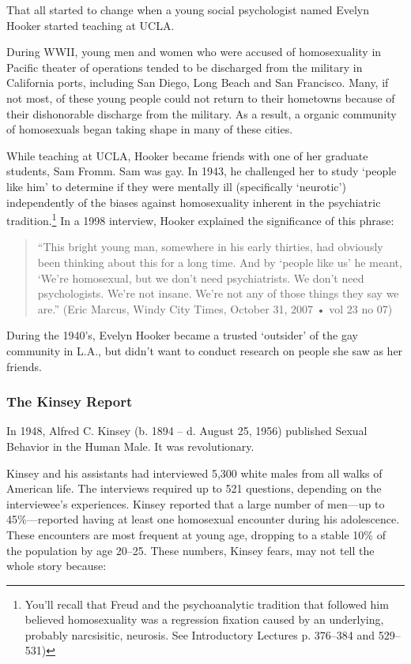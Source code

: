That all started to change when a young social psychologist named Evelyn Hooker started teaching at UCLA.

During WWII, young men and women who were accused of homosexuality in Pacific theater of operations tended to be discharged from the military in California ports, including San Diego, Long Beach and San Francisco. Many, if not most, of these young people could not return to their hometowns because of their dishonorable discharge from the military. As a result, a organic community of homosexuals began taking shape in many of these cities.

While teaching at UCLA, Hooker became friends with one of her graduate students, Sam Fromm. Sam was gay. In 1943, he challenged her to study `people like him' to determine if they were mentally ill (specifically `neurotic') independently of the biases against homosexuality inherent in the psychiatric tradition.\footnote{You'll recall that Freud and the psychoanalytic tradition that followed him believed homosexuality was a regression fixation caused by an underlying, probably narcsisitic, neurosis. See Introductory Lectures p. 376--384 and 529--531)} In a 1998 interview, Hooker explained the significance of this phrase:

\begin{quote}

“This bright young man, somewhere in his early thirties, had obviously been thinking about this for a long time. And by ‘people like us’ he meant, ‘We’re homosexual, but we don’t need psychiatrists. We don’t need psychologists. We’re not insane. We’re not any of those things they say we are.” (Eric Marcus, Windy City Times, October 31, 2007 • vol 23 no 07)
\end{quote}

During the 1940's, Evelyn Hooker became a trusted `outsider' of the gay community in L.A., but didn't want to conduct research on people she saw as her friends.

\subsubsection{The Kinsey Report}
\label{thekinseyreport}

In 1948, Alfred C. Kinsey (b. 1894 – d. August 25, 1956) published Sexual Behavior in the Human Male. It was revolutionary.

Kinsey and his assistants had interviewed 5,300 white males from all walks of American life. The interviews required up to 521 questions, depending on the interviewee’s experiences. Kinsey reported that a large number of men—up to 45\%—reported having at least one homosexual encounter during his adolescence. These encounters are most frequent at young age, dropping to a stable 10\% of the population by age 20--25. These numbers, Kinsey fears, may not tell the whole story because:

